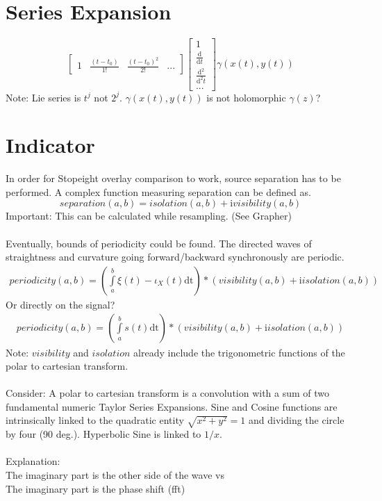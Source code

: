 \documentclass{report}
\begin{document}
\section{Series Expansion}
\begin{equation}
\begin{bmatrix}1 & \frac{(t-t_{0})}{1!} & \frac{(t-t_{0})^{2}}{2!} & ... \end{bmatrix}\begin{bmatrix}1 \\ \frac{\mathrm{d}}{\mathrm{d} t} \\ \frac{\mathrm{d}^2}{\mathrm{d}^2t} \\ ... \end{bmatrix} \gamma (x(t),y(t))
\end{equation}
Note: Lie series is $t^j$ not $2^j$. $\gamma(x(t),y(t))$ is not holomorphic $\gamma(z)$?

\section{Indicator}
In order for Stopeight overlay comparison to work, source separation has to be performed. A complex function measuring separation can be defined as.
\begin{equation}
separation(a,b) = isolation(a,b) + \mathrm{i} visibility(a,b)
\end{equation}
Important: This can be calculated while resampling. (See Grapher)\\\\
Eventually, bounds of periodicity could be found. The directed waves of straightness and curvature going forward/backward synchronously are periodic.
\begin{align}
periodicity(a,b) =  (\int \limits _{a}^{b} \xi(t)-\iota_{X}(t) \mathrm{dt}) *(visibility(a,b) +\mathrm{i} isolation(a,b))
\end{align}
Or directly on the signal?
\begin{align}
periodicity(a,b) =  (\int \limits _{a}^{b} s(t) \mathrm{dt}) *(visibility(a,b) +\mathrm{i} isolation(a,b))
\end{align}
Note: $visibility$ and $isolation$ already include the trigonometric functions of the polar to cartesian transform.\\\\
Consider: A polar to cartesian transform is a convolution with a sum of two fundamental numeric Taylor Series Expansions. Sine and Cosine functions are intrinsically linked to the quadratic entity $\sqrt{x^2 + y^2} =1$ and dividing the circle by four (90 deg.). Hyperbolic Sine is linked to $1/x$.\\\\
Explanation:\\
The imaginary part is the other side of the wave vs\\
The imaginary part is the phase shift (fft)
\end{document}

